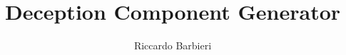 \documentclass[12pt]{article}
\begin{document}
\title{Deception Component Generator}
\author{Riccardo Barbieri}
\maketitle
\newpage

\tableofcontents
\newpage







\end{document}
